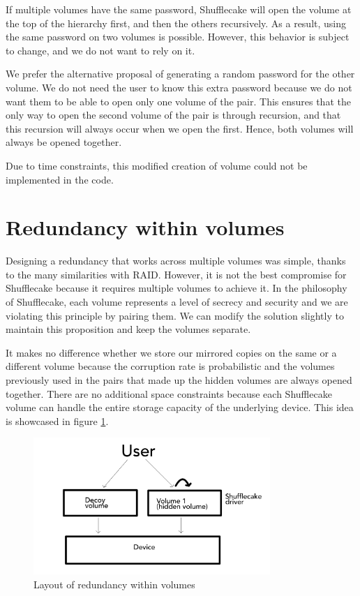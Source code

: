 \documentclass[a4paper,11pt,oneside]{report}
\begin{document}
If multiple volumes have the same password, Shufflecake will open the volume at the top of the hierarchy first, and then the others recursively. As a result, using the same password on two volumes is possible. However, this behavior is subject to change, and we do not want to rely on it.

We prefer the alternative proposal of generating a random password for the other volume. We do not need the user to know this extra password because we do not want them to be able to open only one volume of the pair. This ensures that the only way to open the second volume of the pair is through recursion, and that this recursion will always occur when we open the first. Hence, both volumes will always be opened together.

Due to time constraints, this modified creation of volume could not be implemented in the code.

\section{Redundancy within volumes}

Designing a redundancy that works across multiple volumes was simple, thanks to the many similarities with RAID. However, it is not the best compromise for Shufflecake because it requires multiple volumes to achieve it. In the philosophy of Shufflecake, each volume represents a level of secrecy and security and we are violating this principle by pairing them. We can modify the solution slightly to maintain this proposition and keep the volumes separate.

It makes no difference whether we store our mirrored copies on the same or a different volume because the corruption rate is probabilistic and the volumes previously used in the pairs that made up the hidden volumes are always opened together. There are no additional space constraints because each Shufflecake volume can handle the entire storage capacity of the underlying device. This idea is showcased in figure \ref{fig:red_within}.

\begin{figure}[ht]
\centering
\includegraphics[width=0.8\textwidth]{Figures/red_within.png}
\caption{Layout of redundancy within volumes}
\label{fig:red_within}
\end{figure}
\end{document}
